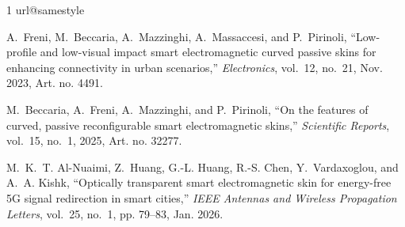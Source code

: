 %
%   
%   
\begin{thebibliography}{1}
\providecommand{\url}[1]{#1}
\csname url@samestyle\endcsname
\providecommand{\newblock}{\relax}
\providecommand{\bibinfo}[2]{#2}
\providecommand{\BIBentrySTDinterwordspacing}{\spaceskip=0pt\relax}
\providecommand{\BIBentryALTinterwordstretchfactor}{4}
\providecommand{\BIBentryALTinterwordspacing}{\spaceskip=\fontdimen2\font plus
\BIBentryALTinterwordstretchfactor\fontdimen3\font minus
  \fontdimen4\font\relax}
\providecommand{\BIBforeignlanguage}[2]{{%
\expandafter\ifx\csname l@#1\endcsname\relax
\typeout{** WARNING: IEEEtran.bst: No hyphenation pattern has been}%
\typeout{** loaded for the language `#1'. Using the pattern for}%
\typeout{** the default language instead.}%
\else
\language=\csname l@#1\endcsname
\fi
#2}}
\providecommand{\BIBdecl}{\relax}
\BIBdecl

A.~Freni, M.~Beccaria, A.~Mazzinghi, A.~Massaccesi, and P.~Pirinoli,
  ``Low-profile and low-visual impact smart electromagnetic curved passive
  skins for enhancing connectivity in urban scenarios,'' \emph{Electronics},
  vol.~12, no.~21, Nov. 2023, {Art. no.} 4491.

M.~Beccaria, A.~Freni, A.~Mazzinghi, and P.~Pirinoli, ``On the features of
  curved, passive reconfigurable smart electromagnetic skins,''
  \emph{Scientific Reports}, vol.~15, no.~1, 2025, {Art. no.} 32277.

M.~K.~T. Al-Nuaimi, Z.~Huang, G.-L. Huang, R.-S. Chen, Y.~Vardaxoglou, and
  A.~A. Kishk, ``Optically transparent smart electromagnetic skin for
  energy-free {5G} signal redirection in smart cities,'' \emph{IEEE Antennas
  and Wireless Propagation Letters}, vol.~25, no.~1, pp. 79--83, Jan. 2026.


\end{thebibliography}
